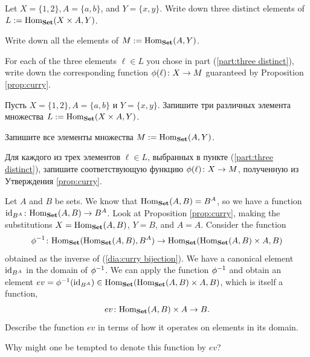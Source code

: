 \documentclass[CT4S-EN-RU]{subfiles}
\begin{document}
\begin{exerciseENG}
Let $X=\{1,2\}, A=\{a,b\}$, and $Y=\{x,y\}$. 
\sexc\label{part:three distinct} Write down three distinct elements of $L:=\textnormal{Hom}_{\mathbf{Set}}(X\times A,Y)$. 
\item Write down all the elements of $M:=\textnormal{Hom}_{\mathbf{Set}}(A,Y)$. 
\item For each of the three elements $\ell\in L$ you chose in part (\ref{part:three distinct}), write down the corresponding function $\phi(\ell)\colon X\rightarrow M$ guaranteed by Proposition \ref{prop:curry}.
\endsexc
\end{exerciseENG}

\begin{exerciseRUS}
Пусть $X=\{1,2\}, A=\{a,b\}$ и $Y=\{x,y\}$. 
\sexc\label{part:three distinct} Запишите три различных элемента множества $L:=\textnormal{Hom}_{\mathbf{Set}}(X\times A,Y)$. 
\item Запишите все элементы множества $M:=\textnormal{Hom}_{\mathbf{Set}}(A,Y)$. 
\item Для каждого из трех элементов $\ell\in L$, выбранных в пункте (\ref{part:three distinct}), запишите соответствующую функцию $\phi(\ell)\colon X\rightarrow M$, полученную из Утверждения \ref{prop:curry}.
\endsexc
\end{exerciseRUS}

\begin{exerciseENG}\label{exc:evaluation}
Let $A$ and $B$ be sets. We know that $\textnormal{Hom}_{\mathbf{Set}}(A,B)=B^A$, so we have a function $\textnormal{id}_{B^A}\colon\textnormal{Hom}_{\mathbf{Set}}(A,B)\rightarrow B^A$. Look at Proposition \ref{prop:curry}, making the substitutions $X=\textnormal{Hom}_{\mathbf{Set}}(A,B)$, $Y=B$, and  $A=A$. Consider the function $$\phi^\m1\taking\Hom_\Set(\Hom_\Set(A,B),B^A)\to\Hom_\Set(\Hom_\Set(A,B)\times A,B)$$ obtained as the inverse of (\ref{dia:curry bijection}). We have a canonical element $\textnormal{id}_{B^A}$ in the domain of $\phi^\m1$. We can apply the function $\phi^\m1$ and obtain an element $ev=\phi^\m1(\id_{B^A})\in\Hom_\Set(\Hom_\Set(A,B)\times A,B)$, which is itself a function, $$ev\colon\textnormal{Hom}_{\mathbf{Set}}(A,B)\times A\rightarrow B.$$ 
\sexc Describe the function $ev$ in terms of how it operates on elements in its domain. 
\item Why might one be tempted to denote this function by $ev$?
\endsexc
\end{exerciseENG}
\end{document}

